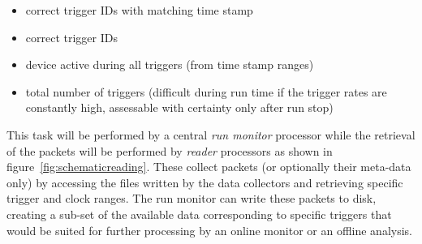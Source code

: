 \documentclass[paper=a4, fontsize=11pt]{scrartcl}	%
\numberwithin{equation}{section}		%
\numberwithin{figure}{section}			%
\numberwithin{table}{section}				%
\begin{document}
\begin{itemize}
\item correct trigger IDs with matching time stamp
\item correct trigger IDs
\item device active during all triggers (from time stamp ranges)
\item total number of triggers (difficult during run time if the trigger
  rates are constantly high, assessable with certainty only after run stop)
\end{itemize}

This task will be performed by a central \emph{run monitor} processor
while the retrieval of the packets will be performed by \emph{reader}
processors as shown in figure~\ref{fig:schematicreading}. These
collect packets (or optionally their meta-data only) by accessing the
files written by the data collectors and retrieving specific trigger
and clock ranges. The run monitor can write these packets to disk,
creating a sub-set of the available data corresponding to specific
triggers that would be suited for further processing by an online
monitor or an offline analysis. 
\end{document}
